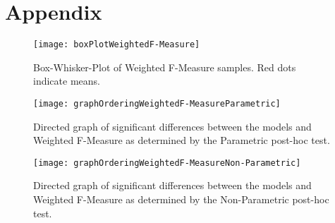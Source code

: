 \documentclass[a4paper,12pt]{article}
\begin{document}
\FloatBarrier
\section{Appendix}
\begin{figure}
\centering
\texttt{[image: boxPlotWeightedF-Measure]}
\caption{Box-Whisker-Plot of Weighted F-Measure samples. Red dots indicate means.}
\label{fig:boxPlotWeightedF-Measure}
\end{figure}

\begin{figure}
\centering
\texttt{[image: graphOrderingWeightedF-MeasureParametric]}
\caption{Directed graph of significant differences between the models and Weighted F-Measure as determined by the Parametric post-hoc test.}
\label{fig:graphOrderingWeightedF-MeasureParametric}
\end{figure}

\begin{figure}
\centering
\texttt{[image: graphOrderingWeightedF-MeasureNon-Parametric]}
\caption{Directed graph of significant differences between the models and Weighted F-Measure as determined by the Non-Parametric post-hoc test.}
\label{fig:graphOrderingWeightedF-MeasureNon-Parametric}
\end{figure}
\end{document}
